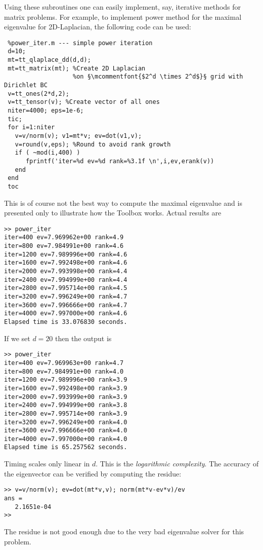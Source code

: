 \documentclass[a4paper,12pt,twoside]{article}
\begin{document}
Using these subroutines one can easily implement, say, iterative methods for matrix problems. 
For example, to implement power method for the maximal eigenvalue for 2D-Laplacian, the following code can be used:
\begin{lstlisting}
 %power_iter.m --- simple power iteration
 d=10;  
 mt=tt_qlaplace_dd(d,d); 
 mt=tt_matrix(mt); %Create 2D Laplacian 
                   %on §\mcommentfont{$2^d \times 2^d$}§ grid with Dirichlet BC 
 v=tt_ones(2*d,2); 
 v=tt_tensor(v); %Create vector of all ones
 niter=4000; eps=1e-6;
 tic;
 for i=1:niter
   v=v/norm(v); v1=mt*v; ev=dot(v1,v);
   v=round(v,eps); %Round to avoid rank growth
   if ( ~mod(i,400) ) 
      fprintf('iter=%d ev=%d rank=%3.1f \n',i,ev,erank(v))
   end
 end
 toc
\end{lstlisting}
This is of course not the best way to compute the maximal eigenvalue and is presented only to illustrate how the Toolbox works.
Actual results are
\begin{lstlisting}
>> power_iter
iter=400 ev=7.969962e+00 rank=4.9 
iter=800 ev=7.984991e+00 rank=4.6 
iter=1200 ev=7.989996e+00 rank=4.6 
iter=1600 ev=7.992498e+00 rank=4.6 
iter=2000 ev=7.993998e+00 rank=4.4 
iter=2400 ev=7.994999e+00 rank=4.4 
iter=2800 ev=7.995714e+00 rank=4.5 
iter=3200 ev=7.996249e+00 rank=4.7 
iter=3600 ev=7.996666e+00 rank=4.7 
iter=4000 ev=7.997000e+00 rank=4.6 
Elapsed time is 33.076830 seconds.
\end{lstlisting}
If we set $d=20$ then the output is 
\begin{lstlisting}
>> power_iter
iter=400 ev=7.969963e+00 rank=4.7 
iter=800 ev=7.984991e+00 rank=4.0 
iter=1200 ev=7.989996e+00 rank=3.9 
iter=1600 ev=7.992498e+00 rank=3.9 
iter=2000 ev=7.993999e+00 rank=3.9 
iter=2400 ev=7.994999e+00 rank=3.8 
iter=2800 ev=7.995714e+00 rank=3.9 
iter=3200 ev=7.996249e+00 rank=4.0 
iter=3600 ev=7.996666e+00 rank=4.0 
iter=4000 ev=7.997000e+00 rank=4.0 
Elapsed time is 65.257562 seconds.
\end{lstlisting}
Timing scales only linear in $d$. This is the \emph{logarithmic complexity}.
The accuracy of the eigenvector can be verified by computing the residue:
\begin{lstlisting}
>> v=v/norm(v); ev=dot(mt*v,v); norm(mt*v-ev*v)/ev
ans =
   2.1651e-04
>>  
\end{lstlisting}
The residue is not good enough due to the very bad eigenvalue solver for this problem.
\end{document}
